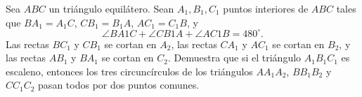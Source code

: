 Sea $ABC$ un triángulo equilátero. Sean $A_1,B_1,C_1$ puntos interiores de $ABC$ tales que $BA_1 =A_1C$, $CB_1 =B_1A$, $AC_1 =C_1B$, y
\[\angle BA1C + \angle CB1A + \angle AC1B = 480^\circ.\]
Las rectas $BC_1$ y $CB_1$ se cortan en $A_2$, las rectas $CA_1$ y $AC_1$ se cortan en $B_2$, y las rectas $AB_1$ y $BA_1$ se cortan en $C_2$. Demuestra que si el triángulo $A_1B_1C_1$ es escaleno, entonces los tres circuncírculos de los triángulos $AA_1A_2$, $BB_1B_2$ y $CC_1C_2$ pasan todos por dos puntos comunes.
